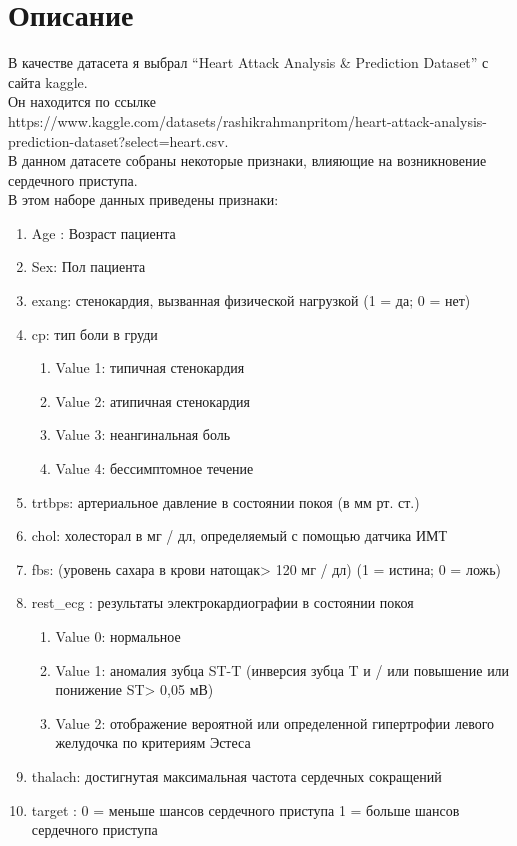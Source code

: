 \section{Описание}

В качестве датасета я выбрал \enquote{Heart Attack Analysis & Prediction Dataset} с сайта kaggle.\\
Он находится по ссылке https://www.kaggle.com/datasets/rashikrahmanpritom/heart-attack-analysis-prediction-dataset?select=heart.csv. \\В данном датасете собраны некоторые признаки, влияющие на возникновение сердечного приступа.\\

В этом наборе данных приведены признаки:\\

\begin{enumerate}
 \item Age : Возраст пациента
 \item Sex: Пол пациента
 \item exang: стенокардия, вызванная физической нагрузкой (1 = да; 0 = нет)
 \item cp: тип боли в груди
	\begin{enumerate}
	 \item Value 1: типичная стенокардия
	 \item Value 2: атипичная стенокардия
	 \item Value 3: неангинальная боль
	 \item Value 4: бессимптомное течение
	\end{enumerate}
 \item trtbps: артериальное давление в состоянии покоя (в мм рт. ст.)
 \item chol: холесторал в мг / дл, определяемый с помощью датчика ИМТ
 \item fbs: (уровень сахара в крови натощак> 120 мг / дл) (1 = истина; 0 = ложь)
 \item rest\_ecg : результаты электрокардиографии в состоянии покоя
	\begin{enumerate}
	 \item Value 0: нормальное
	 \item Value 1: аномалия зубца ST-T (инверсия зубца T и / или повышение или понижение ST> 0,05 мВ)
  	 \item Value 2: отображение вероятной или определенной гипертрофии левого желудочка по критериям Эстеса
	\end{enumerate}
 \item thalach: достигнутая максимальная частота сердечных сокращений
 \item target : 0 = меньше шансов сердечного приступа 1 = больше шансов сердечного приступа
\end{enumerate}




